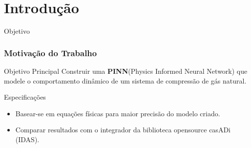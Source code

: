 \section{Introdução}

\begin{frame}{Objetivo}
    \frametitle{Motivação do Trabalho}
    \begin{block}{Objetivo Principal}
        Construir uma \textbf{PINN}(Physics Informed Neural Network) que modele o comportamento dinâmico de um sistema de compressão de gás natural.
    \end{block}
    \begin{block}{Especificações}
        \begin{itemize}
            \item Basear-se em equações físicas para maior precisão do modelo criado.
            \item Comparar resultados com o integrador da biblioteca opensource casADi (IDAS).
        \end{itemize}
    \end{block}
    \end{frame}

